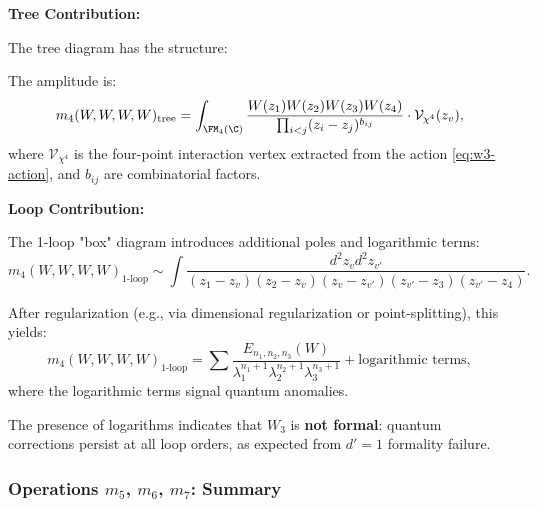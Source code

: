 \textbf{Tree Contribution:}

The tree diagram has the structure:
\begin{center}
\end{center}

The amplitude is:
\begin{equation}
m_4(W,W,W,W)_{\text{tree}} = \int_{\FM_4(\C)} \frac{W(z_1) W(z_2) W(z_3) W(z_4)}{\prod_{i<j} (z_i-z_j)^{b_{ij}}} \cdot \mathcal{V}_{\chi^4}(z_v),
\end{equation}
where $\mathcal{V}_{\chi^4}$ is the four-point interaction vertex extracted from the action \eqref{eq:w3-action}, and $b_{ij}$ are combinatorial factors.

\textbf{Loop Contribution:}

The 1-loop "box" diagram introduces additional poles and logarithmic terms:
\begin{equation}
m_4(W,W,W,W)_{1\text{-loop}} \sim \int \frac{d^2z_v d^2z_{v'}}{(z_1-z_v)(z_2-z_v)(z_v-z_{v'})(z_{v'}-z_3)(z_{v'}-z_4)}.
\end{equation}

After regularization (e.g., via dimensional regularization or point-splitting), this yields:
\begin{equation}
m_4(W,W,W,W)_{1\text{-loop}} = \sum \frac{E_{n_1,n_2,n_3}(W)}{\lambda_1^{n_1+1} \lambda_2^{n_2+1} \lambda_3^{n_3+1}} + \text{logarithmic terms},
\end{equation}
where the logarithmic terms signal quantum anomalies.

\begin{remark}
The presence of logarithms indicates that $W_3$ is \textbf{not formal}: quantum corrections persist at all loop orders, as expected from $d'=1$ formality failure.
\end{remark}

\subsubsection{Operations $m_5$, $m_6$, $m_7$: Summary}

